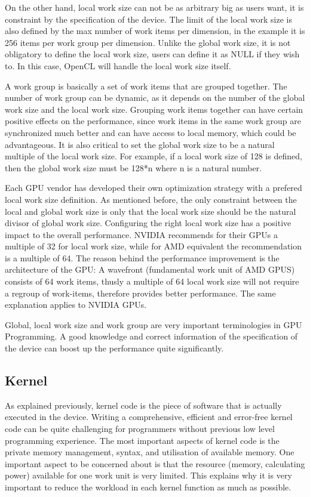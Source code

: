 On the other hand, local work size can not be as arbitrary big as users want, it is constraint by the specification of the device. The limit of the local work size is also defined by the max number of work items per dimension, in the example it is 256 items per work group per dimension. Unlike the global work size, it is not obligatory to define the local work size, users can define it as NULL if they wish to. In this case, OpenCL will handle the local work size itself\cite{openclinaction}.

A work group is basically a set of work items that are grouped together. The number of work group can be dynamic, as it depends on the number of the global work size and the local work size. Grouping work items together can have certain positive effects on the performance, since work items in the same work group are synchronized much better and can have access to local memory, which could be advantageous. It is also critical to set the global work size to be a natural multiple of the local work size. For example, if a local work size of 128 is defined, then the global work size must be 128*n where n is a natural number.

Each GPU vendor has developed their own optimization strategy with a prefered local work size definition. As mentioned before, the only constraint between the local and global work size is only that the local work size should be the natural divisor of global work size. Configuring the right local work size has a positive impact to the overall performance. NVIDIA recommends for their GPUs a multiple of 32 for local work size, while for AMD equivalent the recommendation is a multiple of 64. The reason behind the performance improvement is the architecture of the GPU: A wavefront (fundamental work unit of AMD GPUS) consists of 64 work items, thusly a multiple of 64 local work size will not require a regroup of work-items, therefore provides better performance. The same explanation applies to NVIDIA GPUs.

Global, local work size and work group are very important terminologies in GPU Programming. A good knowledge and correct information of the specification of  the device can boost up the performance quite significantly.
\newpage

\subsection{Kernel}

As explained previously, kernel code is the piece of software that is actually executed in the device. Writing a comprehensive, efficient and error-free kernel code can be quite challenging for programmers without previous low level programming experience. The most important aspects of kernel code is the private memory management, syntax, and utilisation of available memory. One important aspect to be concerned about is that the resource (memory, calculating power) available for one work unit is very limited. This explains why it is very important to reduce the workload in each kernel function as much as possible.

